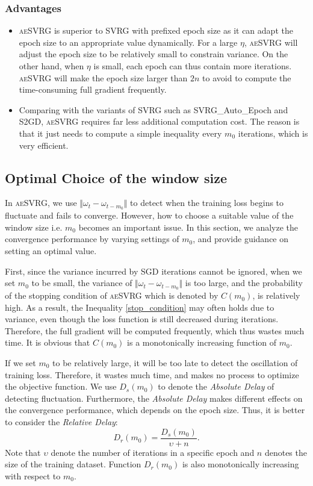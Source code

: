 \documentclass[conference]{IEEEtran}
\begin{document}
\subsubsection{Advantages}
\begin{itemize}
\item \textsc{aeSVRG} is superior to SVRG with prefixed epoch size as it can adapt the epoch size to an appropriate value dynamically. For a large $\eta$, \textsc{aeSVRG} will adjust the epoch size to be relatively small to constrain variance. On the other hand, when $\eta$ is small, each epoch can thus contain more iterations. \textsc{aeSVRG} will make the epoch size larger than $2n$ to avoid to compute the time-consuming full gradient frequently.
\item Comparing with the variants of SVRG such as SVRG\_Auto\_Epoch and S2GD, \textsc{aeSVRG} requires far less additional computation cost. The reason is that it just needs to compute a simple inequality every $m_0$ iterations, which is very efficient.
\end{itemize}
 
 \subsection{Optimal Choice of the window size}
 \label{m0_analysis}
 In \textsc{aeSVRG}, we use $\Vert\omega_{t}-\omega_{t-m_0}\Vert$ to detect when the training loss begins to fluctuate and fails to converge. However, how to choose a suitable value of the window size i.e. $m_0$ becomes an important issue. In this section, we analyze the convergence performance by varying settings of $m_0$, and provide guidance on setting an optimal value.
 
 First, since the variance incurred by SGD iterations cannot be ignored, when we set $m_0$ to be small, the variance of $\Vert\omega_{t}-\omega_{t-m_0}\Vert$ is too large, and  the probability of the stopping condition of \textsc{aeSVRG} which is denoted by $C(m_0)$, is relatively high. As a result, the Inequality \ref{stop_condition} may often holds due to variance, even though the loss function is still decreased during iterations. Therefore, the full gradient will be computed frequently, which thus wastes much time.  It is obvious that $C(m_0)$ is a monotonically increasing function of $m_0$.
 
 If we set $m_0$ to be relatively large, it will be too late to detect the oscillation of training loss. Therefore, it wastes much time, and makes no process to optimize the objective function. We use $D_s(m_0)$ to denote the \emph{Absolute Delay} of detecting fluctuation. Furthermore, the \emph{Absolute Delay} makes different effects on the convergence performance, which  depends on the epoch size. Thus, it is better to consider the \emph{Relative Delay}:
 \begin{equation}
 \label{relative_delay}
 D_r(m_0)=\frac{D_s(m_0)}{\upsilon+n}.
 \end{equation}
 Note that $\upsilon$ denote the number of iterations in a specific epoch and $n$ denotes the size of the training dataset. Function $D_r(m_0)$ is also monotonically increasing with respect to $m_0$.
\end{document}
